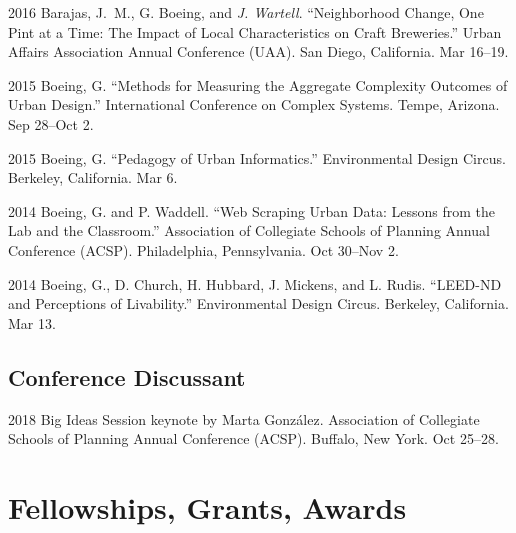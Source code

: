 \documentclass[12pt,letterpaper]{report}
\begin{document}
\begin{tablist}
\item[2016] \tab Barajas, J.~M., G. Boeing, and \textit{J. Wartell}. \enquote{Neighborhood Change, One Pint at a Time: The Impact of Local Characteristics on Craft Breweries.} Urban Affairs Association Annual Conference (UAA). San Diego, California. Mar 16--19.

\item[2015] \tab Boeing, G. \enquote{Methods for Measuring the Aggregate Complexity Outcomes of Urban Design.} International Conference on Complex Systems. Tempe, Arizona. Sep 28--Oct 2.

\item[2015] \tab Boeing, G. \enquote{Pedagogy of Urban Informatics.} Environmental Design Circus. Berkeley, California. Mar 6.

\item[2014] \tab Boeing, G. and P. Waddell. \enquote{Web Scraping Urban Data: Lessons from the Lab and the Classroom.} Association of Collegiate Schools of Planning Annual Conference (ACSP). Philadelphia, Pennsylvania. Oct 30--Nov 2.

\item[2014] \tab Boeing, G., D. Church, H. Hubbard, J. Mickens, and L. Rudis. \enquote{LEED-ND and Perceptions of Livability.} Environmental Design Circus. Berkeley, California. Mar 13.

\end{tablist}

\subsection*{Conference Discussant}

\begin{tablist}
	
	\item[2018] \tab Big Ideas Session keynote by Marta González. Association of Collegiate Schools of Planning Annual Conference (ACSP). Buffalo, New York. Oct 25--28.
	
\end{tablist}



\section*{Fellowships, Grants, Awards}
\end{document}
